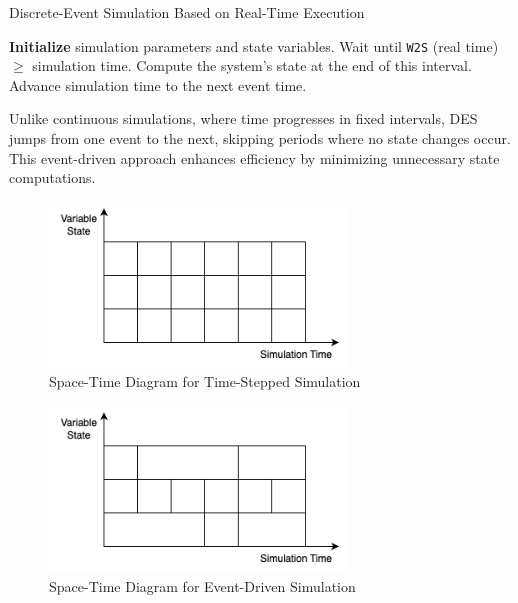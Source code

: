 \begin{algorithm}[H]
\caption{Discrete-Event Simulation Based on Real-Time Execution} \label{alg:client_simulation}
\begin{algorithmic}[1]
    \STATE \textbf{Initialize} simulation parameters and state variables.
        \STATE Wait until \texttt{W2S} (real time) $\geq$ simulation time.
        \STATE Compute the system's state at the end of this interval.
        \STATE Advance simulation time to the next event time.
    \ENDWHILE
\end{algorithmic}
\end{algorithm}

Unlike continuous simulations, where time progresses in fixed intervals, DES jumps from one event to the next, skipping periods where no state changes occur. This event-driven approach enhances efficiency by minimizing unnecessary state computations.

\begin{figure}[H]
    \centering
    \includegraphics[width=0.7\textwidth]{images/constTime.png}
    \caption{Space-Time Diagram for Time-Stepped Simulation}
    \label{fig:constTime}
\end{figure}

\begin{figure}[H]
    \centering
    \includegraphics[width=0.7\textwidth]{images/sparseTime.png}
    \caption{Space-Time Diagram for Event-Driven Simulation}
    \label{fig:sparseTime}
\end{figure}

